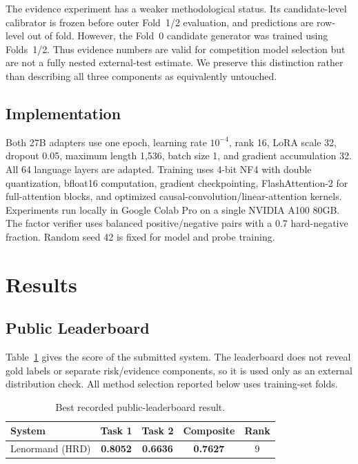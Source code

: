 \documentclass[conference]{IEEEtran}
\newcommand{\method}{\textsc{HRD}}
\begin{document}
The evidence experiment has a weaker methodological status. Its candidate-level calibrator is frozen before outer Fold~1/2 evaluation, and predictions are row-level out of fold. However, the Fold~0 candidate generator was trained using Folds~1/2. Thus evidence numbers are valid for competition model selection but are not a fully nested external-test estimate. We preserve this distinction rather than describing all three components as equivalently untouched.

\subsection{Implementation}
Both 27B adapters use one epoch, learning rate $10^{-4}$, rank 16, LoRA scale 32, dropout 0.05, maximum length 1,536, batch size 1, and gradient accumulation 32. All 64 language layers are adapted. Training uses 4-bit NF4 with double quantization, bfloat16 computation, gradient checkpointing, FlashAttention-2 for full-attention blocks, and optimized causal-convolution/linear-attention kernels. Experiments run locally in Google Colab Pro on a single NVIDIA A100 80GB. The factor verifier uses balanced positive/negative pairs with a 0.7 hard-negative fraction. Random seed 42 is fixed for model and probe training.

\section{Results}
\subsection{Public Leaderboard}
Table~\ref{tab:leaderboard} gives the score of the submitted system. The leaderboard does not reveal gold labels or separate risk/evidence components, so it is used only as an external distribution check. All method selection reported below uses training-set folds.

\begin{table}[t]
\caption{Best recorded public-leaderboard result.}
\label{tab:leaderboard}
\centering
\begin{tabular}{@{}lcccc@{}}
\toprule
System & Task 1 & Task 2 & Composite & Rank \\
\midrule
Lenormand (\method{}) & \textbf{0.8052} & \textbf{0.6636} & \textbf{0.7627} & 9 \\
\bottomrule
\end{tabular}
\end{table}
\end{document}
